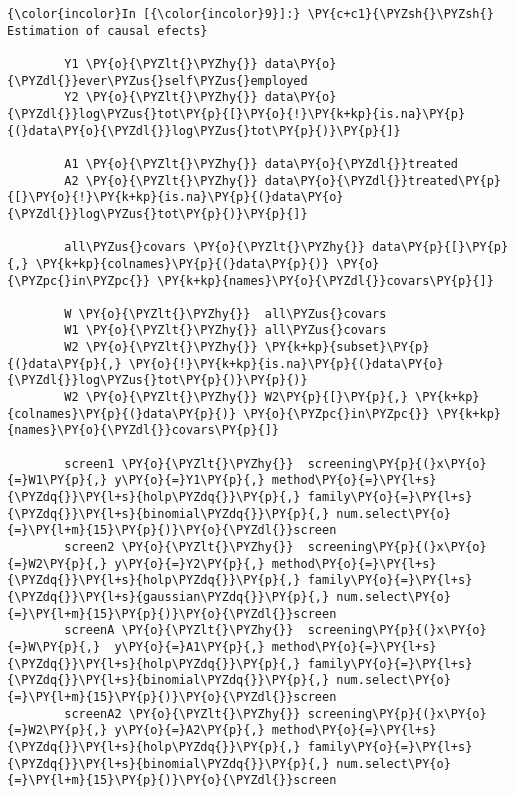   \begin{Verbatim}[commandchars=\\\{\}]
{\color{incolor}In [{\color{incolor}9}]:} \PY{c+c1}{\PYZsh{}\PYZsh{} Estimation of causal efects}
        
        Y1 \PY{o}{\PYZlt{}\PYZhy{}} data\PY{o}{\PYZdl{}}ever\PYZus{}self\PYZus{}employed
        Y2 \PY{o}{\PYZlt{}\PYZhy{}} data\PY{o}{\PYZdl{}}log\PYZus{}tot\PY{p}{[}\PY{o}{!}\PY{k+kp}{is.na}\PY{p}{(}data\PY{o}{\PYZdl{}}log\PYZus{}tot\PY{p}{)}\PY{p}{]}
        
        A1 \PY{o}{\PYZlt{}\PYZhy{}} data\PY{o}{\PYZdl{}}treated
        A2 \PY{o}{\PYZlt{}\PYZhy{}} data\PY{o}{\PYZdl{}}treated\PY{p}{[}\PY{o}{!}\PY{k+kp}{is.na}\PY{p}{(}data\PY{o}{\PYZdl{}}log\PYZus{}tot\PY{p}{)}\PY{p}{]}
        
        all\PYZus{}covars \PY{o}{\PYZlt{}\PYZhy{}} data\PY{p}{[}\PY{p}{,} \PY{k+kp}{colnames}\PY{p}{(}data\PY{p}{)} \PY{o}{\PYZpc{}in\PYZpc{}} \PY{k+kp}{names}\PY{o}{\PYZdl{}}covars\PY{p}{]}
        
        W \PY{o}{\PYZlt{}\PYZhy{}}  all\PYZus{}covars
        W1 \PY{o}{\PYZlt{}\PYZhy{}} all\PYZus{}covars
        W2 \PY{o}{\PYZlt{}\PYZhy{}} \PY{k+kp}{subset}\PY{p}{(}data\PY{p}{,} \PY{o}{!}\PY{k+kp}{is.na}\PY{p}{(}data\PY{o}{\PYZdl{}}log\PYZus{}tot\PY{p}{)}\PY{p}{)}
        W2 \PY{o}{\PYZlt{}\PYZhy{}} W2\PY{p}{[}\PY{p}{,} \PY{k+kp}{colnames}\PY{p}{(}data\PY{p}{)} \PY{o}{\PYZpc{}in\PYZpc{}} \PY{k+kp}{names}\PY{o}{\PYZdl{}}covars\PY{p}{]}
        
        screen1 \PY{o}{\PYZlt{}\PYZhy{}}  screening\PY{p}{(}x\PY{o}{=}W1\PY{p}{,} y\PY{o}{=}Y1\PY{p}{,} method\PY{o}{=}\PY{l+s}{\PYZdq{}}\PY{l+s}{holp\PYZdq{}}\PY{p}{,} family\PY{o}{=}\PY{l+s}{\PYZdq{}}\PY{l+s}{binomial\PYZdq{}}\PY{p}{,} num.select\PY{o}{=}\PY{l+m}{15}\PY{p}{)}\PY{o}{\PYZdl{}}screen
        screen2 \PY{o}{\PYZlt{}\PYZhy{}}  screening\PY{p}{(}x\PY{o}{=}W2\PY{p}{,} y\PY{o}{=}Y2\PY{p}{,} method\PY{o}{=}\PY{l+s}{\PYZdq{}}\PY{l+s}{holp\PYZdq{}}\PY{p}{,} family\PY{o}{=}\PY{l+s}{\PYZdq{}}\PY{l+s}{gaussian\PYZdq{}}\PY{p}{,} num.select\PY{o}{=}\PY{l+m}{15}\PY{p}{)}\PY{o}{\PYZdl{}}screen
        screenA \PY{o}{\PYZlt{}\PYZhy{}}  screening\PY{p}{(}x\PY{o}{=}W\PY{p}{,}  y\PY{o}{=}A1\PY{p}{,} method\PY{o}{=}\PY{l+s}{\PYZdq{}}\PY{l+s}{holp\PYZdq{}}\PY{p}{,} family\PY{o}{=}\PY{l+s}{\PYZdq{}}\PY{l+s}{binomial\PYZdq{}}\PY{p}{,} num.select\PY{o}{=}\PY{l+m}{15}\PY{p}{)}\PY{o}{\PYZdl{}}screen 
        screenA2 \PY{o}{\PYZlt{}\PYZhy{}} screening\PY{p}{(}x\PY{o}{=}W2\PY{p}{,} y\PY{o}{=}A2\PY{p}{,} method\PY{o}{=}\PY{l+s}{\PYZdq{}}\PY{l+s}{holp\PYZdq{}}\PY{p}{,} family\PY{o}{=}\PY{l+s}{\PYZdq{}}\PY{l+s}{binomial\PYZdq{}}\PY{p}{,} num.select\PY{o}{=}\PY{l+m}{15}\PY{p}{)}\PY{o}{\PYZdl{}}screen 
        

\end{Verbatim}
